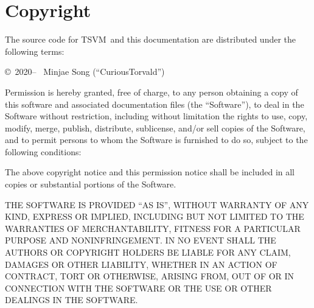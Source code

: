 \documentclass[10pt, stock, openany, chapter]{memoir}
\newcommand{\thismachine}{TSVM}
\begin{document}
\chapter*{Copyright}

The source code for \thismachine\ and this documentation are distributed under the following terms:

\copyright\ 2020-- \ Minjae Song (``CuriousTorvald'')

Permission is hereby granted, free of charge, to any person obtaining a copy
of this software and associated documentation files (the ``Software''), to deal
in the Software without restriction, including without limitation the rights
to use, copy, modify, merge, publish, distribute, sublicense, and/or sell
copies of the Software, and to permit persons to whom the Software is
furnished to do so, subject to the following conditions:

The above copyright notice and this permission notice shall be included in all
copies or substantial portions of the Software.

THE SOFTWARE IS PROVIDED ``AS IS'', WITHOUT WARRANTY OF ANY KIND, EXPRESS OR
IMPLIED, INCLUDING BUT NOT LIMITED TO THE WARRANTIES OF MERCHANTABILITY,
FITNESS FOR A PARTICULAR PURPOSE AND NONINFRINGEMENT. IN NO EVENT SHALL THE
AUTHORS OR COPYRIGHT HOLDERS BE LIABLE FOR ANY CLAIM, DAMAGES OR OTHER
LIABILITY, WHETHER IN AN ACTION OF CONTRACT, TORT OR OTHERWISE, ARISING FROM,
OUT OF OR IN CONNECTION WITH THE SOFTWARE OR THE USE OR OTHER DEALINGS IN THE
SOFTWARE.

\printindex

\afterpage{\pagestyle{empty}\null\newpage}
\end{document}
